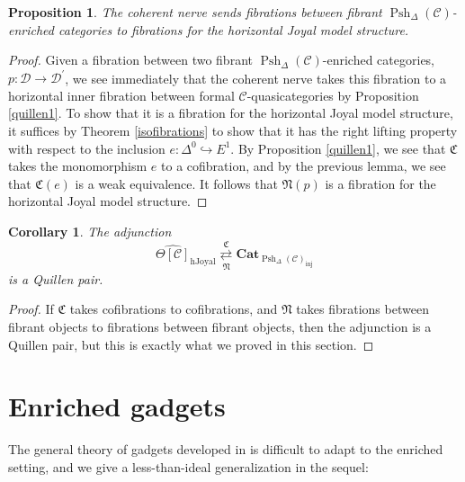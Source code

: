 \documentclass{amsart}
\numberwithin{equation}{section}
\theoremstyle{plain}   %
\newtheorem{prop}[subsection]{Proposition}
\newtheorem{cor}[subsection]{Corollary}
\theoremstyle{remark}
\theoremstyle{plain}
\newcommand{\Cat}{\ensuremath{\mathbf{Cat}}}
\newcommand{\C}{\ensuremath{\mathcal{C}}}
\newcommand{\cellset}{\ensuremath{\widehat{\Theta[\mathcal{C}]}}}
\newcommand{\spsh}{\ensuremath{\operatorname{Psh}_\Delta(\mathcal{C})}}
\begin{document}
\begin{prop}
	The coherent nerve sends fibrations between fibrant \(\spsh\)-enriched categories to fibrations for the horizontal Joyal model structure.
\end{prop}
\begin{proof}
	Given a fibration between two fibrant \(\spsh\)-enriched categories, \(p:\mathcal{D}\to \mathcal{D}^\prime\), we see immediately that the coherent nerve takes this fibration to a horizontal inner fibration between formal \(\C\)-quasicategories by Proposition \ref{quillen1}.  To show that it is a fibration for the horizontal Joyal model structure, it suffices by Theorem \ref{isofibrations} to show that it has the right lifting property with respect to the inclusion \(e:\Delta^0 \hookrightarrow E^1\). By Proposition \ref{quillen1}, we see that \(\mathfrak{C}\) takes the monomorphism \(e\) to a cofibration, and by the previous lemma, we see that \(\mathfrak{C}(e)\) is a weak equivalence.  It follows that \(\mathfrak{N}(p)\) is a fibration for the horizontal Joyal model structure.
\end{proof}

\begin{cor}\label{horizquillen}
	The adjunction 
	\[\cellset_{\mathrm{hJoyal}} \underset{\mathfrak{N}}{\overset{\mathfrak{C}}{\rightleftarrows}} \Cat_{\spsh_{\mathrm{inj}}}\]
	is a Quillen pair.
\end{cor}
\begin{proof}
	If \(\mathfrak{C}\) takes cofibrations to cofibrations, and \(\mathfrak{N}\) takes fibrations between fibrant objects to fibrations between fibrant objects, then the adjunction is a Quillen pair, but this is exactly what we proved in this section.
\end{proof}

\section{Enriched gadgets}
The general theory of gadgets developed in \cite{ds1} is difficult to adapt to the enriched setting, and we give a less-than-ideal generalization in the sequel:
\end{document}
